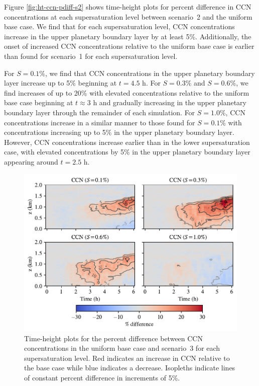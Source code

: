 Figure \ref{fig:ht-ccn-pdiff-s2} shows time-height plots for percent difference in CCN concentrations at each supersaturation level between scenario~2 and the uniform base case. We find that for each supersaturation level, CCN concentrations increase in the upper planetary boundary layer by at least 5\%. Additionally, the onset of increased CCN concentrations relative to the uniform base case is earlier than found for scenario~1 for each supersaturation level. 

For $S=0.1\%$, we find that CCN concentrations in the upper planetary boundary layer increase up to 5\% beginning at $t=4.5$ h. For $S=0.3\%$ and $S=0.6\%$, we find increases of up to 20\% with elevated concentrations relative to the uniform base case beginning at $t\approx3$ h and gradually increasing in the upper planetary boundary layer through the remainder of each simulation. For $S=1.0\%$, CCN concentrations increase in a similar manner to those found for $S=0.1\%$ with concentrations increasing up to 5\% in the upper planetary boundary layer. However, CCN concentrations increase earlier than in the lower supersaturation case, with elevated concentrations by 5\% in the upper planetary boundary layer appearing around $t=2.5$ h.

\begin{figure}[!t]
  \centering
    \includegraphics[width=\textwidth]{figures/chapter5/height-time-ccn-pdiff-point-source-1x1.pdf}
    \caption{Time-height plots for the percent difference between CCN concentrations in the uniform base case and scenario~3 for each supersaturation level. Red indicates an increase in CCN relative to the base case while blue indicates a decrease. Isopleths indicate lines of constant percent difference in increments of 5\%.}
    \label{fig:ht-ccn-pdiff-s3}
\end{figure}

